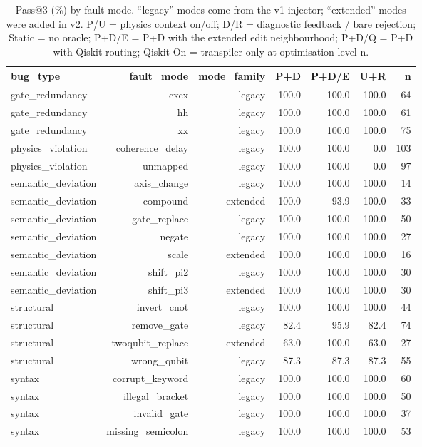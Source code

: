 \begin{table}[t]
\centering
\caption{Pass@3 (\%) by fault mode. ``legacy'' modes come from the v1 injector; ``extended'' modes were added in v2. P/U = physics context on/off; D/R = diagnostic feedback / bare rejection; Static = no oracle; P+D/E = P+D with the extended edit neighbourhood; P+D/Q = P+D with Qiskit routing; Qiskit On = transpiler only at optimisation level n.}
\label{tab:mode}
\footnotesize
\setlength{\tabcolsep}{3pt}
\begin{tabular}{lrrrrrr}
\toprule
bug\_type & fault\_mode & mode\_family & P+D & P+D/E & U+R & n \\
\midrule
gate\_redundancy & cxcx & legacy & 100.0 & 100.0 & 100.0 & 64 \\
gate\_redundancy & hh & legacy & 100.0 & 100.0 & 100.0 & 61 \\
gate\_redundancy & xx & legacy & 100.0 & 100.0 & 100.0 & 75 \\
physics\_violation & coherence\_delay & legacy & 100.0 & 100.0 & 0.0 & 103 \\
physics\_violation & unmapped & legacy & 100.0 & 100.0 & 0.0 & 97 \\
semantic\_deviation & axis\_change & legacy & 100.0 & 100.0 & 100.0 & 14 \\
semantic\_deviation & compound & extended & 100.0 & 93.9 & 100.0 & 33 \\
semantic\_deviation & gate\_replace & legacy & 100.0 & 100.0 & 100.0 & 50 \\
semantic\_deviation & negate & legacy & 100.0 & 100.0 & 100.0 & 27 \\
semantic\_deviation & scale & extended & 100.0 & 100.0 & 100.0 & 16 \\
semantic\_deviation & shift\_pi2 & legacy & 100.0 & 100.0 & 100.0 & 30 \\
semantic\_deviation & shift\_pi3 & extended & 100.0 & 100.0 & 100.0 & 30 \\
structural & invert\_cnot & legacy & 100.0 & 100.0 & 100.0 & 44 \\
structural & remove\_gate & legacy & 82.4 & 95.9 & 82.4 & 74 \\
structural & twoqubit\_replace & extended & 63.0 & 100.0 & 63.0 & 27 \\
structural & wrong\_qubit & legacy & 87.3 & 87.3 & 87.3 & 55 \\
syntax & corrupt\_keyword & legacy & 100.0 & 100.0 & 100.0 & 60 \\
syntax & illegal\_bracket & legacy & 100.0 & 100.0 & 100.0 & 50 \\
syntax & invalid\_gate & legacy & 100.0 & 100.0 & 100.0 & 37 \\
syntax & missing\_semicolon & legacy & 100.0 & 100.0 & 100.0 & 53 \\
\bottomrule
\end{tabular}
\end{table}
